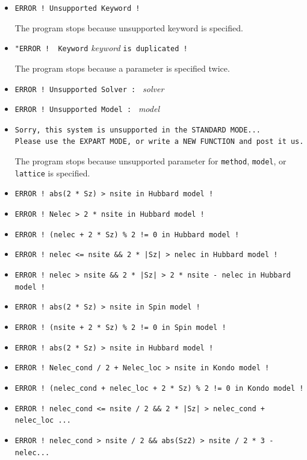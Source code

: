 \begin{itemize}
\item \verb|ERROR ! Unsupported Keyword !|

The program stops because unsupported keyword is specified.

\item \verb|"ERROR !  Keyword| \textit{keyword} \verb|is duplicated !|

The program stops because a parameter is specified twice.

\item \verb|ERROR ! Unsupported Solver : | \textit{solver} \vspace{-0.3cm}
\item \verb|ERROR ! Unsupported Model : | \textit{model} \vspace{-0.3cm}
\item \verb|Sorry, this system is unsupported in the STANDARD MODE...| \\
  \verb|Please use the EXPART MODE, or write a NEW FUNCTION and post it us.|

The program stops because unsupported parameter for 
\verb|method|, \verb|model|, or \verb|lattice|
is specified.

\item \verb#ERROR ! abs(2 * Sz) > nsite in Hubbard model !# \vspace{-0.3cm}
\item \verb#ERROR ! Nelec > 2 * nsite in Hubbard model !#\vspace{-0.3cm}
\item \verb#ERROR ! (nelec + 2 * Sz) % 2 != 0 in Hubbard model !#\vspace{-0.3cm}
\item \verb#ERROR ! nelec <= nsite && 2 * |Sz| > nelec in Hubbard model !#\vspace{-0.3cm}
\item \verb#ERROR ! nelec > nsite && 2 * |Sz| > 2 * nsite - nelec in Hubbard model !#\vspace{-0.3cm}
\item \verb#ERROR ! abs(2 * Sz) > nsite in Spin model !#\vspace{-0.3cm}
\item \verb#ERROR ! (nsite + 2 * Sz) % 2 != 0 in Spin model !#\vspace{-0.3cm}
\item \verb#ERROR ! abs(2 * Sz) > nsite in Hubbard model !#\vspace{-0.3cm}
\item \verb#ERROR ! Nelec_cond / 2 + Nelec_loc > nsite in Kondo model !#\vspace{-0.3cm}
\item \verb#ERROR ! (nelec_cond + nelec_loc + 2 * Sz) % 2 != 0 in Kondo model !#\vspace{-0.3cm}
\item \verb#ERROR ! nelec_cond <= nsite / 2 && 2 * |Sz| > nelec_cond + nelec_loc ...#\vspace{-0.3cm}
\item \verb#ERROR ! nelec_cond > nsite / 2 && abs(Sz2) > nsite / 2 * 3 - nelec...#


\end{itemize}
